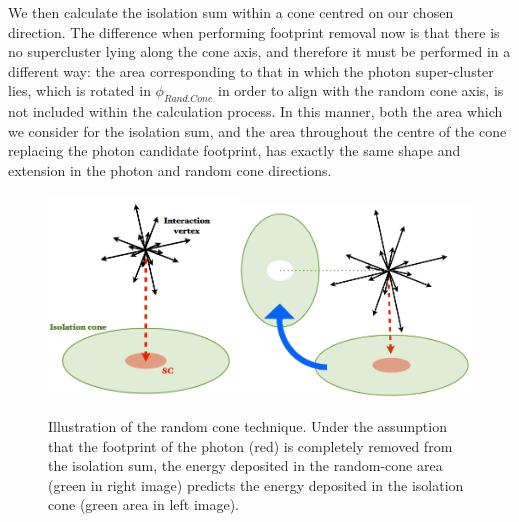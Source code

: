 We then calculate the isolation sum within a cone centred on our chosen direction. The difference when performing footprint removal now is that there is no supercluster lying along the cone axis, and therefore it must be performed in a different way: the area corresponding to that in which the photon super-cluster lies, which is rotated in $\phi_{Rand.Cone}$ in order to align with the random cone axis, is not included within the calculation process. In this manner, both the area which we consider for the isolation sum, and the area throughout the centre of the cone replacing the photon candidate footprint, has exactly the same shape and extension in the photon and random cone directions.   

\begin{figure} 
\begin{center}
\includegraphics[width=0.45\textwidth]{Figures/RandomCone1.png}\includegraphics[width=0.55\textwidth]{Figures/RandomCone2.png}
\end{center}
\caption{Illustration of the random cone technique. Under the assumption that the footprint of the photon (red) is completely removed from the isolation sum, the energy deposited in the random-cone area (green in right image) predicts the energy deposited in the isolation cone (green area in left image). \cite{MarcoThesis}}
\label{fig-RandomConeIsolation}
\end{figure}

